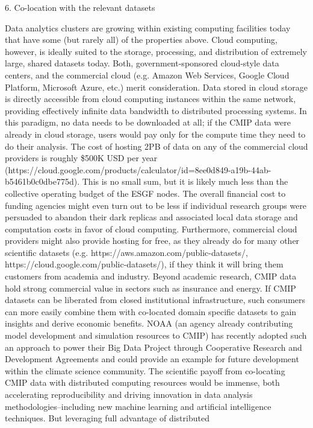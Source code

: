 \documentclass[gmd,manuscript]{copernicus}
\begin{document}
6. Co-location with the relevant datasets

Data analytics clusters are growing within existing computing
facilities today that have some (but rarely all) of the properties
above. Cloud computing, however, is ideally suited to the storage,
processing, and distribution of extremely large, shared datasets
today. Both, government-sponsored cloud-style data centers, and the
commercial cloud (e.g. Amazon Web Services, Google Cloud Platform,
Microsoft Azure, etc.) merit consideration. Data stored in cloud
storage is directly accessible from cloud computing instances within
the same network, providing effectively infinite data bandwidth to
distributed processing systems. In this paradigm, no data needs to be
downloaded at all; if the CMIP data were already in cloud storage,
users would pay only for the compute time they need to do their
analysis. The cost of hosting 2PB of data on any of the commercial
cloud providers is roughly \$500K USD per year
(https://cloud.google.com/products/calculator/id=8ee0d849-a19b-44ab-b5461b0c0dbe775d).
This is no small sum, but it is likely much less than the collective
operating budget of the ESGF nodes. The overall financial cost to
funding agencies might even turn out to be less if individual research
groups were persuaded to abandon their dark replicas and associated
local data storage and computation costs in favor of cloud computing.
Furthermore, commercial cloud providers might also provide hosting for
free, as they already do for many other scientific datasets (e.g.
https://aws.amazon.com/public-datasets/,
https://cloud.google.com/public-datasets/), if they think it will
bring them customers from academia and industry. Beyond academic
research, CMIP data hold strong commercial value in sectors such as
insurance and energy. If CMIP datasets can be liberated from closed
institutional infrastructure, such consumers can more easily combine
them with co-located domain specific datasets to gain insights and
derive economic benefits. NOAA (an agency already contributing model
development and simulation resources to CMIP) has recently adopted
such an approach to power their Big Data Project through Cooperative
Research and Development Agreements and could provide an example for
future development within the climate science community. The
scientific payoff from co-locating CMIP data with distributed
computing resources would be immense, both accelerating
reproducibility and driving innovation in data analysis
methodologies–including new machine learning and artificial
intelligence techniques. But leveraging full advantage of distributed
\end{document}
